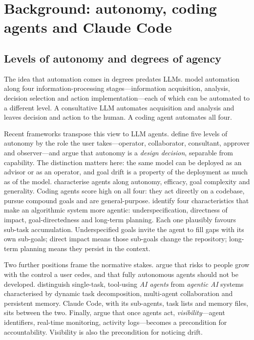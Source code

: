 \section{Background: autonomy, coding agents and Claude Code}
\label{sec:background}

\subsection{Levels of autonomy and degrees of agency}

The idea that automation comes in degrees predates LLMs. \citet{parasuraman2000model} model
automation along four information-processing stages---information acquisition, analysis, decision
selection and action implementation---each of which can be automated to a different level. A
consultative LLM automates acquisition and analysis and leaves decision and action to the human. A
coding agent automates all four.

Recent frameworks transpose this view to LLM agents. \citet{feng2025levels} define five levels of
autonomy by the role the user takes---operator, collaborator, consultant, approver and observer---and
argue that autonomy is a \emph{design decision}, separable from capability. The distinction matters
here: the same model can be deployed as an advisor or as an operator, and goal drift is a property of
the deployment as much as of the model. \citet{kasirzadeh2025characterizing} characterise agents
along autonomy, efficacy, goal complexity and generality. Coding agents score high on all four:
they act directly on a codebase, pursue compound goals and are general-purpose.
\citet{chan2023harms} identify four characteristics that make an algorithmic system more agentic:
underspecification, directness of impact, goal-directedness and long-term planning. Each one
plausibly favours sub-task accumulation. Underspecified goals invite the agent to fill gaps with its
own sub-goals; direct impact means those sub-goals change the repository; long-term planning means
they persist in the context.

Two further positions frame the normative stakes. \citet{mitchell2025fully} argue that risks to people
grow with the control a user cedes, and that fully autonomous agents should not be developed.
\citet{sapkota2025agents} distinguish single-task, tool-using \emph{AI agents} from \emph{agentic AI}
systems characterised by dynamic task decomposition, multi-agent collaboration and persistent memory.
Claude Code, with its sub-agents, task lists and memory files, sits between the two. Finally,
\citet{chan2024visibility} argue that once agents act, \emph{visibility}---agent identifiers,
real-time monitoring, activity logs---becomes a precondition for accountability. Visibility is also
the precondition for noticing drift.

